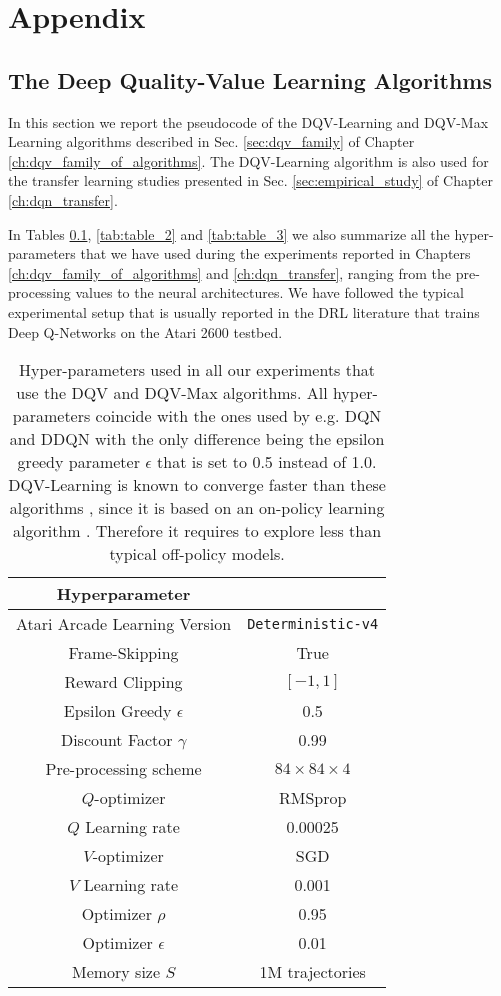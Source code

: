 
\chapter*{Appendix}
\label{ch:appendix}


\section{The Deep Quality-Value Learning Algorithms}

In this section we report the pseudocode of the DQV-Learning and DQV-Max Learning algorithms described in Sec. \ref{sec:dqv_family} of Chapter \ref{ch:dqv_family_of_algorithms}. The DQV-Learning algorithm is also used for the transfer learning studies presented in Sec. \ref{sec:empirical_study} of Chapter \ref{ch:dqn_transfer}. 

In Tables \ref{tab:table_1}, \ref{tab:table_2} and \ref{tab:table_3} we also summarize all the hyper-parameters that we have used during the experiments reported in Chapters \ref{ch:dqv_family_of_algorithms} and \ref{ch:dqn_transfer}, ranging from the pre-processing values to the neural architectures. We have followed the typical experimental setup that is usually reported in the DRL literature \cite{mnih2015human, van2015deep, wang2016dueling, castro2018dopamine, sabatelli2020deep} that trains Deep Q-Networks on the Atari 2600 testbed.

\begin{table}[ht!]
\centering
\caption{Hyper-parameters used in all our experiments that use the DQV and DQV-Max algorithms. All hyper-parameters coincide with the ones used by e.g. DQN and DDQN with the only difference being the epsilon greedy parameter $\epsilon$ that is set to 0.5 instead of 1.0. DQV-Learning is known to converge faster than these algorithms \cite{sabatelli2018deepqv}, since it is based on an on-policy learning algorithm \cite{wiering2005qv}. Therefore it requires to explore less than typical off-policy models.}
\begin{tabular}{c | c |  }
Hyperparameter \\
\hline \hline
Atari Arcade Learning Version  & \texttt{Deterministic-v4} \\
Frame-Skipping & True \\ 
Reward Clipping & $[-1,1]$ \\ 
Epsilon Greedy $\epsilon$ & 0.5 \\
Discount Factor $\gamma$ & 0.99 \\ 
Pre-processing scheme & $84\times84\times4$ \\ 
$Q$-optimizer & RMSprop \\ 
$Q$ Learning rate & 0.00025 \\ 
$V$-optimizer & SGD \\ 
$V$ Learning rate & 0.001 \\
Optimizer $\rho$ & 0.95 \\ 
Optimizer $\epsilon$ & 0.01 \\ 
Memory size $S$ & 1M trajectories 
\end{tabular}
\label{tab:table_1}
\end{table}

